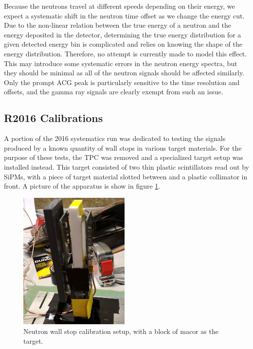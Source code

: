 Because the neutrons travel at different speeds depending on their energy, we expect a systematic shift in the neutron time offset as we change the energy cut.
Due to the non-linear relation between the true energy of a neutron and the energy deposited in the detector, determining the true energy distribution for a given detected energy bin is complicated and relies on knowing the shape of the energy distribution.  
Therefore, no attempt is currently made to model this effect.
This may introduce some systematic errors in the neutron energy spectra, but they should be minimal as all of the neutron signals should be affected similarly.
Only the prompt ACG peak is particularly sensitive to the time resolution and offsets, and the gamma ray signals are clearly exempt from such an issue.

\subsection{R2016 Calibrations}

A portion of the 2016 systematics run was dedicated to testing the signals produced by a known quantity of wall stops in various target materials.  
For the purpose of these tests, the TPC was removed and a specialized target setup was installed instead.  
This target consisted of two thin plastic scintillators read out by SiPMs, with a piece of target material slotted between and a plastic collimator in front.
A picture of the apparatus is show in figure \ref{fig:r9setup}.

\begin{figure}[h]
  \includegraphics[width=0.49\textwidth]{neutrons/figures/R9Calib_Setup.jpg}
  \caption{Neutron wall stop calibration setup, with a block of macor as the target.}
  \label{fig:r9setup}
\end{figure}

